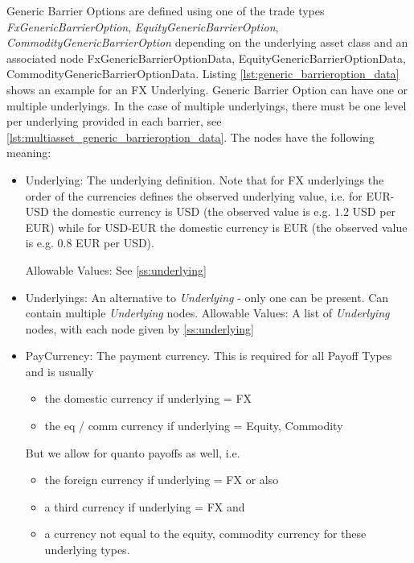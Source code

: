 Generic Barrier Options are defined using one of the trade types \emph{FxGenericBarrierOption}, \emph{EquityGenericBarrierOption},
\emph{CommodityGenericBarrierOption} depending on the underlying asset class and an associated node FxGenericBarrierOptionData,
EquityGenericBarrierOptionData, CommodityGenericBarrierOptionData. Listing \ref{lst:generic_barrieroption_data} shows an
example for an FX Underlying. Generic Barrier Option can have one or multiple underlyings. In the case of multiple underlyings, there must be one level per underlying provided in each barrier, see \ref{lst:multiasset_generic_barrieroption_data}. The nodes have the following meaning:

\begin{itemize}
\item Underlying: The underlying definition. Note that for FX underlyings the order of the currencies defines the
  observed underlying value, i.e. for EUR-USD the domestic currency is USD (the observed value is e.g. $1.2$ USD per
  EUR) while for USD-EUR the domestic currency is EUR (the observed value is e.g. $0.8$ EUR per USD).

  Allowable Values: See \ref{ss:underlying}
  
\item Underlyings: An alternative to \emph{Underlying} - only one can be present. Can contain multiple \emph{Underlying} nodes.
  Allowable Values: A list of \emph{Underlying} nodes, with each node given by \ref{ss:underlying}

\item PayCurrency: The payment currency. This is required for all Payoff Types and is usually

  \begin{itemize}
  \item the domestic currency if underlying = FX
  \item the eq / comm currency if underlying = Equity, Commodity
  \end{itemize}

  But we allow for quanto payoffs as well, i.e.

  \begin{itemize}
  \item the foreign currency if underlying = FX or also
  \item a third currency if underlying = FX and
  \item  a currency not equal to the equity, commodity currency for these underlying types.
  \end{itemize}


\end{itemize}
